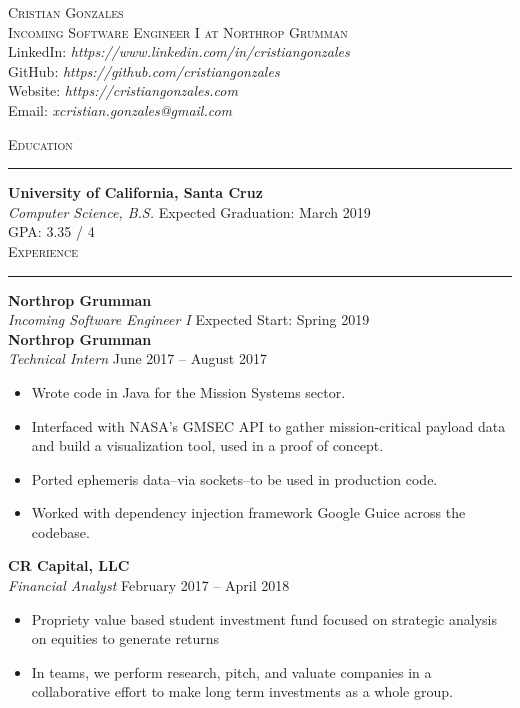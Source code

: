 \documentclass{res}
\begin{document}
\begin{resume}

\begin{center}
\textsc{{\Huge Cristian Gonzales}}\\
\vspace{1mm}
\textsc{\large Incoming Software Engineer I at Northrop Grumman}\\
\vspace{1mm}
LinkedIn: \textit{https://www.linkedin.com/in/cristiangonzales}\\
GitHub: \textit{https://github.com/cristiangonzales}\\
Website: \textit{https://cristiangonzales.com}\\
Email: \textit{xcristian.gonzales@gmail.com}\\
\end{center}


\textsc{{\Large Education}}
\vspace{0.5mm}
\hrule width18.5cm
\textbf{University of California, Santa Cruz}\\
\textit{Computer Science, B.S.}
\hfill
Expected Graduation: March 2019\\
GPA: 3.35 / 4\\

\textsc{{\Large Experience}}
\vspace{0.5mm}
\hrule width18.5cm
\textbf{Northrop Grumman}\\
\textit{Incoming Software Engineer I}
\hfill
Expected Start: Spring 2019\\[2mm]
\textbf{Northrop Grumman}\\
\textit{Technical Intern}
\hfill
June 2017 -- August 2017\\[1mm]
	\begin{itemize}
		\vspace{-3mm}
		\item Wrote code in Java for the Mission Systems sector.
		\item Interfaced with NASA's GMSEC API to gather mission-critical payload data and build a visualization tool, used in a proof of concept.
		\item Ported ephemeris data--via sockets--to be used in production code.
		\item Worked with dependency injection framework Google Guice across the codebase.
	\end{itemize}
\textbf{CR Capital, LLC}\\
\textit{Financial Analyst}
\hfill
February 2017 -- April 2018\\
	\begin{itemize}
		\vspace{-3mm}
		\item Propriety value based student investment fund focused on strategic analysis on equities to generate returns
		\item In teams, we perform research, pitch, and valuate companies in a collaborative effort to make long term investments as a whole group.
	\end{itemize}
	\vspace{0.5mm}


\end{resume}
\end{document}
